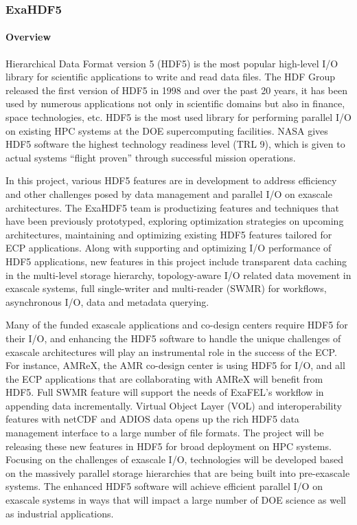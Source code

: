 \subsubsection{ ExaHDF5}\label{subsubsect:exahdf5}

\paragraph{Overview} 


Hierarchical Data Format version 5 (HDF5) is the most popular high-level I/O library for scientific applications to write and read data files. The HDF Group released the first version of HDF5 in 1998 and over the past 20 years, it has been used by numerous applications not only in scientific domains but also in finance, space technologies, etc. HDF5 is the most used library for performing parallel I/O on existing HPC systems at the DOE supercomputing facilities. NASA gives HDF5 software the highest technology readiness level (TRL 9), which is given to actual systems “flight proven” through successful mission operations.

In this project, various HDF5 features are in development to address efficiency and other challenges posed by data management and parallel I/O on exascale architectures. The ExaHDF5 team is productizing features and techniques that have been previously prototyped, exploring optimization strategies on upcoming architectures, maintaining and optimizing existing HDF5 features tailored for ECP applications. Along with supporting and optimizing I/O performance of HDF5 applications, new features in this project include transparent data caching in the multi-level storage hierarchy, topology-aware I/O related data movement in exascale systems, full single-writer and multi-reader (SWMR) for workflows, asynchronous I/O, data and metadata querying. 

Many of the funded exascale applications and co-design centers require HDF5 for their I/O, and enhancing the HDF5 software to handle the unique challenges of exascale architectures will play an instrumental role in the success of the ECP. For instance, AMReX, the AMR co-design center is using HDF5 for I/O, and all the ECP applications that are collaborating with AMReX will benefit from HDF5. Full SWMR feature will support the needs of ExaFEL’s workflow in appending data incrementally. Virtual Object Layer (VOL) and interoperability features with netCDF and ADIOS data opens up the rich HDF5 data management interface to a large number of file formats. The project will be releasing these new features in HDF5 for broad deployment on HPC systems. Focusing on the challenges of exascale I/O, technologies will be developed based on the massively parallel storage hierarchies that are being built into pre-exascale systems. The enhanced HDF5 software will achieve efficient parallel I/O on exascale systems in ways that will impact a large number of DOE science as well as industrial applications.

